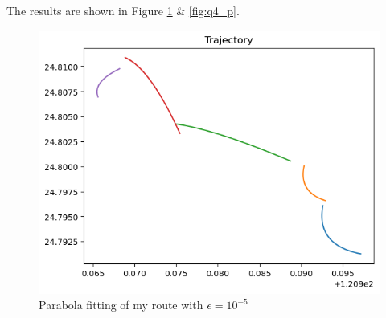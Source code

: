 \documentclass[12pt, a4paper]{article}
\begin{document}
The results are shown in Figure \ref{fig:q4} \& \ref{fig:q4_p}.

\begin{figure}[htbp]
\centering
\includegraphics[width=.69\linewidth]{q4}
\caption{Parabola fitting of my route with $\epsilon=10^{-5}$}
\label{fig:q4}
\end{figure}
\end{document}
